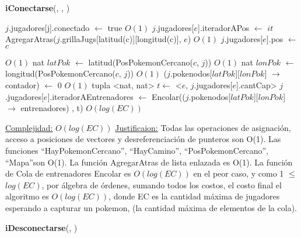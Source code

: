 \begin{Algoritmos}
\begin{algorithm}[H]
\begin{algorithmic}[1]
\end{algorithmic}
\end{algorithm}

\begin{algorithm}[H]
{\textbf{iConectarse}(, , )}
\begin{algorithmic}[1]

\State $j$.jugadores[\hspace{0.5mm}j\hspace{0.5mm}].conectado $\gets$ true \Comment $O(1)$
\State $j$.jugadores[$e$].iteradorAPos $\gets$ $it$ AgregarAtras($j$.grillaJugs[latitud(c)][longitud(c)], $e$) \Comment $O(1)$
\State $j$.jugadores[$e$].pos $\gets$ $c$

   \Comment $O(1)$
      \State nat $latPok$ $\gets$ latitud(PosPokemonCercano($c$, $j$)) \Comment $O(1)$
      \State nat $lonPok$ $\gets$ longitud(PosPokemonCercano($c$, $j$)) \Comment $O(1)$
      \State ($j$.pokenodos[$latPok$][$lonPok$] $\rightarrow$ contador) $\gets$ 0 \Comment $O(1)$
      \State tupla <nat, nat> $t \gets$ <$e$, $j$.jugadores[$e$].cantCap> 
      \State $j$.jugadores[$e$].iteradorAEntrenadores $\gets$ Encolar(($j$.pokenodos[$latPok$][$lonPok$] $\rightarrow$ entrenadores) , t) \Comment $O(log(EC))$

  \EndIf

\EndIf

\medskip
\State \underline{Complejidad:} $O(log(EC))$ 
\State \underline{Justificaion:} Todas las operaciones de asignaci\'on, acceso a posiciones de vectores y desreferenciaci\'on de punteros son O(1). Las funciones ``HayPokemonCercano'', ``HayCamino'', ``PosPokemonCercano'', ``Mapa''\hspace{0.5mm}son O(1). La funci\'on AgregarAtras de lista enlazada es O(1). La funci\'on de Cola de entrenadores Encolar es $O(log(EC))$ en el peor caso, y como 1 $\leq$ $log(EC)$, por \'algebra de \'ordenes, sumando todos los costos, el costo final el algoritmo es $O(log(EC))$, donde EC es la cantidad m\'axima de jugadores esperando a capturar un pokemon, (la cantidad m\'axima de elementos de la cola).


\end{algorithmic}
\end{algorithm}

\begin{algorithm}[H]
{\textbf{iDesconectarse}(, )}
\begin{algorithmic}[1]


\end{algorithmic}
\end{algorithm}
\end{Algoritmos}

